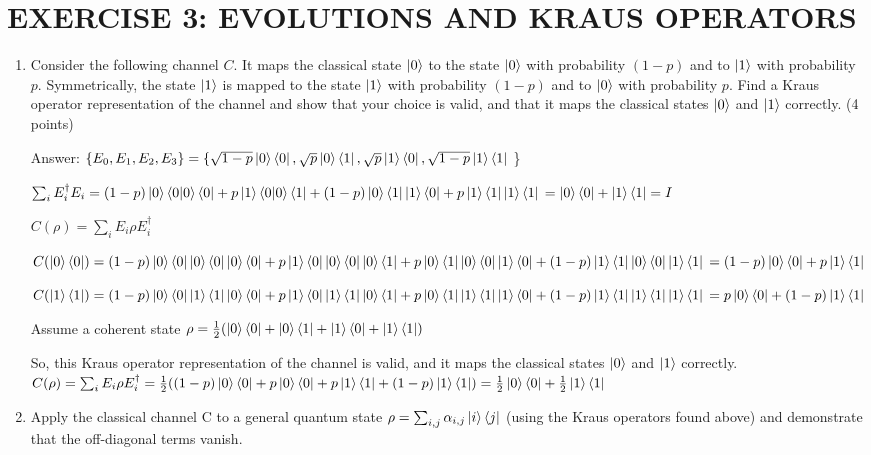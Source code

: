 \documentclass{article}
\begin{document}
\section{EXERCISE 3: EVOLUTIONS AND KRAUS OPERATORS}
\begin{enumerate}
    \item Consider the following channel $C$. It maps the classical state $\ket{0}$ to the state $\ket{0}$ with probability $(1-p)$ and to $\ket{1}$ with probability $p$. Symmetrically, the state $\ket{1}$ is mapped to the state $\ket{1}$ with probability $(1-p)$ and to $\ket{0}$ with probability $p$. Find a Kraus operator representation of the channel and show that your choice is valid, and that it maps the classical states $\ket{0}$ and $\ket{1}$ correctly. (4 points)

          Answer: $\{E_0,E_1,E_2,E_3\}=
              \{
              \sqrt{1-p}\ket{0}\bra{0}, \sqrt{p}\ket{0}\bra{1},\sqrt{p}\ket{1}\bra{0},\sqrt{1-p}\ket{1}\bra{1}$
          \}

          $\sum_i E_i^\dagger E_i=(1-p)\ket{0}\braket{0|0}\bra{0}+p\ket{1}\braket{0|0}\bra{1}+(1-p)\ket{0}\bra{1}\ket{1}\bra{0}+p\ket{1}\bra{1}\ket{1}\bra{1}
              \\=\ket{0}\bra{0}+\ket{1}\bra{1}=I$

          $C(\rho)=\sum_i E_i\rho E_i^\dagger$

          $C(\ket{0}\bra{0})=(1-p)\ket{0}\bra{0}\ket{0}\bra{0}\ket{0}\bra{0}+p\ket{1}\bra{0}\ket{0}\bra{0}\ket{0}\bra{1}+p\ket{0}\bra{1}\ket{0}\bra{0}\ket{1}\bra{0}+(1-p)\ket{1}\bra{1}\ket{0}\bra{0}\ket{1}\bra{1}
              \\=(1-p)\ket{0}\bra{0}+p\ket{1}\bra{1}$

          $C(\ket{1}\bra{1})=(1-p)\ket{0}\bra{0}\ket{1}\bra{1}\ket{0}\bra{0}+p\ket{1}\bra{0}\ket{1}\bra{1}\ket{0}\bra{1}+p\ket{0}\bra{1}\ket{1}\bra{1}\ket{1}\bra{0}+(1-p)\ket{1}\bra{1}\ket{1}\bra{1}\ket{1}\bra{1}
              \\=p\ket{0}\bra{0}+(1-p)\ket{1}\bra{1}$

          Assume a coherent state $\rho=\frac{1}{2}(\ket{0}\bra{0}+\ket{0}\bra{1}+\ket{1}\bra{0}+\ket{1}\bra{1})$


          So, this Kraus operator representation of the channel is valid, and it maps the classical states $\ket{0}$ and $\ket{1}$ correctly.
          $C(\rho)=\sum_iE_i\rho E_i^\dagger=\frac{1}{2}((1-p)\ket{0}\bra{0}+p\ket{0}\bra{0}+p\ket{1}\bra{1}+(1-p)\ket{1}\bra{1})=\frac{1}{2}\ket{0}\bra{0}+\frac{1}{2}\ket{1}\bra{1}$
    \item Apply the classical channel C to a general quantum state $\rho = \sum_{i,j} \alpha_{i,j} \ket{i}\bra{j}$ (using the Kraus operators found above) and demonstrate that the off-diagonal terms vanish.


\end{enumerate}
\end{document}
